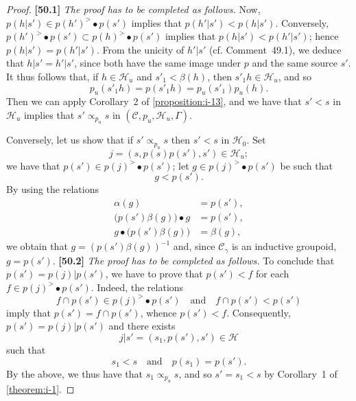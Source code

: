 \documentclass[a4paper,fleqn]{article}
\theoremstyle{plain}
\theoremstyle{definition}
\newenvironment{longcomm}[1]
  {\noindent\textbf{[#1]}\rmfamily}
  {}
\newcommand{\textand}{\quad\text{and}\quad}
\newcommand{\CC}{\mathcal{C}}
\newcommand{\HH}{\mathcal{H}}
\newcommand{\subs}{\mathrel{\propto}}
\begin{document}
\begin{proof}
\begin{longcomm}{50.1}
    \emph{The proof has to be completed as follows.}
    Now, $p(h|s')\in p(h')^>\bullet p(s')$ implies that $p(h'|s')<p(h|s')$.
    Conversely, $p(h')^>\bullet p(s')\subset p(h)^>\bullet p(s')$ implies that $p(h|s')<p(h'|s')$;
    hence $p(h|s')=p(h'|s')$.
    From the unicity of $h'|s'$ (cf. Comment~49.1), we deduce that $h|s'=h'|s'$, since both have the same image under $p$ and the same source $s'$.
  \end{longcomm}
  It thus follows that, if $h\in\HH_u$ and $s'_1<\beta(h)$, then $s'_1h\in\HH_u$, and so
  \[
    p_u(s'_1h)
    = p(s'_1h)
    = p_u(s'_1)p_u(h).
  \]
  Then we can apply Corollary~2 of \cref{proposition:i-13}, and we have that $s'<s$ in $\HH_u$ implies that $s'\subs_{p_u}s$ in $(\CC,p_u,\HH_u,\Gamma)$.

  Conversely, let us show that if $s'\subs_{p_u}s$ then $s'<s$ in $\HH_0$.
  Set
  \[
    j
    = (s, p(s)p(s'), s')
    \in \HH_u;
  \]
  we have that $p(s')\in p(j)^>\bullet p(s')$;
  let $g\in p(j)^>\bullet p(s')$ be such that
  \[
    g<p(s').
  \]
  By using the relations
  \[
    \begin{aligned}
      \alpha(g)
      &= p(s'),
    \\\big( p(s')\beta(g) \big)\bullet g
      &= p(s'),
    \\g\bullet\big( p(s')\beta(g) \big)
      &= \beta(g),
    \end{aligned}
  \]
  we obtain that $g=(p(s')\beta(g))^{-1}$ and, since $\CC_\gamma$ is an inductive groupoid, $g=p(s')$.
  \begin{longcomm}{50.2}
    \emph{The proof has to be completed as follows.}
    To conclude that $p(s')=p(j)|p(s')$, we have to prove that $p(s')<f$ for each $f\in p(j)^>\bullet p(s')$.
    Indeed, the relations
    \[
      f\cap p(s')
      \in p(j)^>\bullet p(s')
      \textand
      f\cap p(s')
      < p(s')
    \]
    imply that $p(s')=f\cap p(s')$, whence $p(s')<f$.
  \end{longcomm}
  Consequently, $p(s')=p(j)|p(s')$ and there exists
  \[
    j|s'
    = (s_1,p(s'),s')
    \in\HH
  \]
  such that
  \[
    s_1<s
    \textand
    p(s_1)=p(s').
  \]
  By the above, we thus have that $s_1\subs_{p_u}s$, and so $s'=s_1<s$ by Corollary~1 of \cref{theorem:i-1}.
\end{proof}
\end{document}
